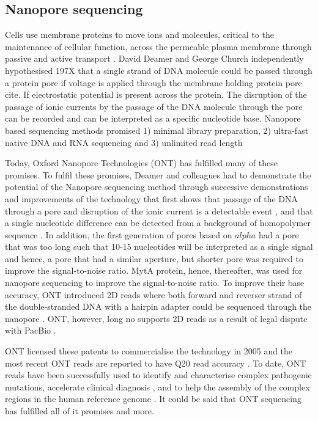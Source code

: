 \subsection{Nanopore sequencing}

Cells use membrane proteins to move ions and molecules, critical to the maintenance of cellular function, across the permeable plasma membrane through passive and active transport \cite{}. David Deamer and George Church independently hypothesised 197X that a single strand of DNA molecule could be passed through a protein pore if voltage is applied through the membrane holding protein pore cite{}. If electrostatic potential is present across the protein. The disruption of the passage of ionic currents by the passage of the DNA molecule through the pore can be recorded and can be interpreted as a specific nucleotide base. Nanopore based sequencing methods promised 1) minimal library preparation, 2) ultra-fast native DNA and RNA sequencing and 3) unlimited read length 

Today, Oxford Nanopore Technologies (ONT) has fulfilled many of these promises. To fulfil these promises, Deamer and colleagues had to demonstrate the potential of the Nanopore sequencing method through successive demonstrations and improvements of the technology that first shows that passage of the DNA through a pore and disruption of the ionic current is a detectable event \cite{}, and that a single nucleotide difference can be detected from a background of homopolymer sequence \cite{}. In addition, the first generation of pores based on $alpha$ had a pore that was too long such that 10-15 nucleotides will be interpreted as a single signal and hence, a pore that had a similar aperture, but shorter pore was required to improve the signal-to-noise ratio. MytA protein, hence, thereafter, was used for nanopore sequencing to improve the signal-to-noise ratio. To improve their base accuracy, ONT introduced 2D reads where both forward and reverser strand of the double-stranded DNA with a hairpin adapter could be sequenced through the nanopore \cite{}. ONT, however, long no supports 2D reads as a result of legal dispute with PacBio \cite{}.

ONT licensed these patents to commercialise the technology in 2005 and the most recent ONT reads are reported to have Q20 read accuracy \cite{}. To date, ONT reads have been successfully used to identify and characterise complex pathogenic mutations\cite{},  accelerate clinical diagnosis \cite{}, and to help the assembly of the complex regions in the human reference genome \cite{}. It could be said that ONT sequencing has fulfilled all of it promises and more.   


